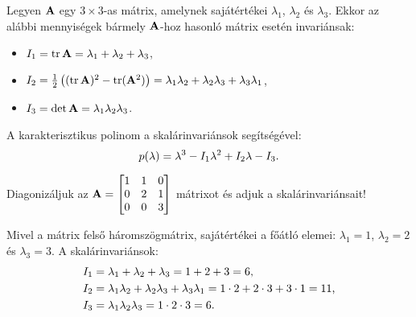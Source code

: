 \documentclass{szb-practice}
\begin{document}
\begin{blueBox}

  Legyen $\mathbf{A}$ egy $3 \times 3$-as mátrix, amelynek sajátértékei $\lambda_1$,
  $\lambda_2$ és $\lambda_3$. Ekkor az alábbi mennyiségek bármely $\mathbf{A}$-hoz
  hasonló mátrix esetén invariánsak:
  \begin{itemize}[itemsep=-.33em]
    \item $
            I_1
            = \operatorname{tr} \mathbf{A}
            = \lambda_1 + \lambda_2 + \lambda_3
          $,

    \item $
            I_2
            = \frac{1}{2} \left(
            (\operatorname{tr} \mathbf{A})^2 - \operatorname{tr} (\mathbf{A}^2)
            \right)
            = \lambda_1 \lambda_2 + \lambda_2 \lambda_3 + \lambda_3 \lambda_1
          $,

    \item $
            I_3
            = \det \mathbf{A}
            = \lambda_1 \lambda_2 \lambda_3
          $.
  \end{itemize}
\end{blueBox}

\begin{note}
  A karakterisztikus polinom a skalárinvariánsok segítségével:
  $$
    p(\lambda) = \lambda^3 - I_1 \lambda^2 + I_2 \lambda - I_3
    \text.
  $$
\end{note}

\begin{example}[][nobreak]
  Diagonizáljuk az $\mathbf{A} = \begin{bmatrix}
      1 & 1 & 0 \\
      0 & 2 & 1 \\
      0 & 0 & 3
    \end{bmatrix}$ mátrixot és adjuk a skalárinvariánsait!

  Mivel a mátrix felső háromszögmátrix, sajátértékei a főátló elemei:
  $\lambda_1 = 1$, $\lambda_2 = 2$ és $\lambda_3 = 3$. A skalárinvariánsok:
  \begin{align*}
    I_1 & = \lambda_1 + \lambda_2 + \lambda_3 = 1 + 2 + 3 = 6
    \text,                                                                  \\
    I_2 & = \lambda_1 \lambda_2 + \lambda_2 \lambda_3 + \lambda_3 \lambda_1
    = 1 \cdot 2 + 2 \cdot 3 + 3 \cdot 1 = 11
    \text,                                                                  \\
    I_3 & = \lambda_1 \lambda_2 \lambda_3 = 1 \cdot 2 \cdot 3 = 6
    \text.
  \end{align*}
\end{example}
\end{document}

